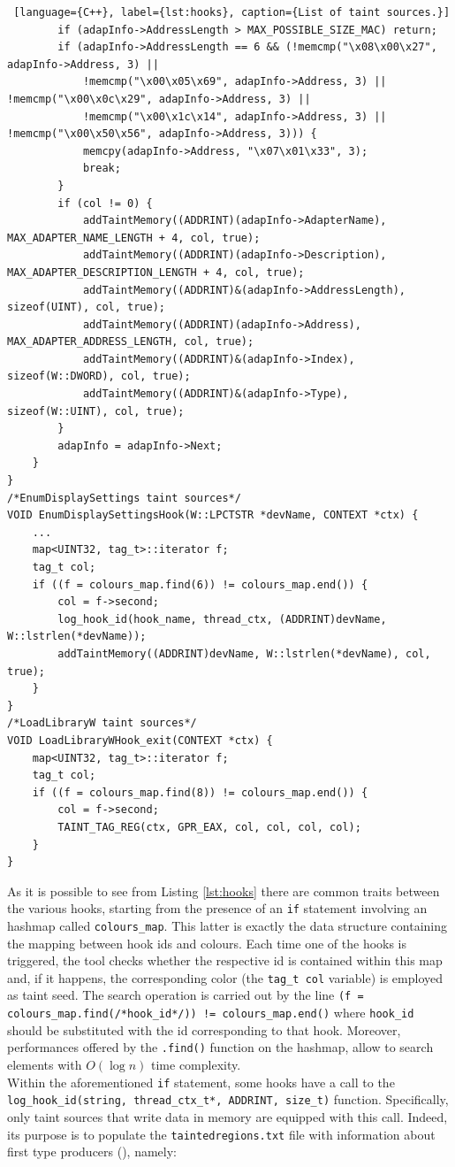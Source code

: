 \documentclass[LaM,binding=0.6cm]{sapthesis}
\begin{document}
\begin{lstlisting} [language={C++}, label={lst:hooks}, caption={List of taint sources.}]
		if (adapInfo->AddressLength > MAX_POSSIBLE_SIZE_MAC) return;
		if (adapInfo->AddressLength == 6 && (!memcmp("\x08\x00\x27", adapInfo->Address, 3) ||
			!memcmp("\x00\x05\x69", adapInfo->Address, 3) || !memcmp("\x00\x0c\x29", adapInfo->Address, 3) ||
			!memcmp("\x00\x1c\x14", adapInfo->Address, 3) || !memcmp("\x00\x50\x56", adapInfo->Address, 3))) {
			memcpy(adapInfo->Address, "\x07\x01\x33", 3);
			break;
		}
		if (col != 0) {
			addTaintMemory((ADDRINT)(adapInfo->AdapterName), MAX_ADAPTER_NAME_LENGTH + 4, col, true);
			addTaintMemory((ADDRINT)(adapInfo->Description), MAX_ADAPTER_DESCRIPTION_LENGTH + 4, col, true);
			addTaintMemory((ADDRINT)&(adapInfo->AddressLength), sizeof(UINT), col, true);
			addTaintMemory((ADDRINT)(adapInfo->Address), MAX_ADAPTER_ADDRESS_LENGTH, col, true);
			addTaintMemory((ADDRINT)&(adapInfo->Index), sizeof(W::DWORD), col, true);
			addTaintMemory((ADDRINT)&(adapInfo->Type), sizeof(W::UINT), col, true);
		}
		adapInfo = adapInfo->Next;
	}
}
/*EnumDisplaySettings taint sources*/
VOID EnumDisplaySettingsHook(W::LPCTSTR *devName, CONTEXT *ctx) {
	...
	map<UINT32, tag_t>::iterator f;
	tag_t col;
	if ((f = colours_map.find(6)) != colours_map.end()) {
		col = f->second;
		log_hook_id(hook_name, thread_ctx, (ADDRINT)devName, W::lstrlen(*devName));
		addTaintMemory((ADDRINT)devName, W::lstrlen(*devName), col, true);
	}
}
/*LoadLibraryW taint sources*/
VOID LoadLibraryWHook_exit(CONTEXT *ctx) {
	map<UINT32, tag_t>::iterator f;
	tag_t col;
	if ((f = colours_map.find(8)) != colours_map.end()) {
		col = f->second;
		TAINT_TAG_REG(ctx, GPR_EAX, col, col, col, col);
	}
}
\end{lstlisting}
As it is possible to see from Listing \ref{lst:hooks} there are common traits between the various hooks, starting from the presence of an \texttt{if} statement involving an hashmap called \texttt{colours\_map}. This latter is exactly the data structure containing the mapping between hook ids and colours. Each time one of the hooks is triggered, the tool checks whether the respective id is contained within this map and, if it happens, the corresponding color (the \texttt{tag\_t col} variable) is employed as taint seed. The search operation is carried out by the line \texttt{(f = colours\_map.find(/*hook\_id*/)) != colours\_map.end()} where \texttt{hook\_id} should be substituted with the id corresponding to that hook. Moreover, performances offered by the \texttt{.find()} function on the hashmap, allow to search elements with $O(\log n)$ time complexity.\\
Within the aforementioned \texttt{if} statement, some hooks have a call to the \texttt{log\_hoo\-k\_id(string, thread\_ctx\_t*, ADDRINT, size\_t)} function. Specifically, only taint sources that write data in memory are equipped with this call. Indeed, its purpose is to populate the \texttt{taintedregions.txt} file with information about first type producers (), namely:
\end{document}
